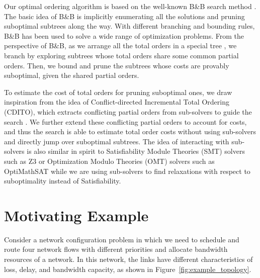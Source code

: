 \documentclass[letterpaper]{article} %
\theoremstyle{definition}
\begin{document}
Our optimal ordering algorithm is based on the well-known B\&B search method \cite{lawler1966branch}. The basic idea of B\&B is implicitly enumerating all the solutions and pruning suboptimal subtrees along the way. With different branching and bounding rules, B\&B has been used to solve a wide range of optimization problems. From the perspective of B\&B, as we arrange all the total orders in a special tree \cite{ono2005constant}, we branch by exploring subtrees whose total orders share some common partial orders. Then, we bound and prune the subtrees whose costs are provably suboptimal, given the shared partial orders. 

To estimate the cost of total orders for pruning suboptimal ones, we draw inspiration from the idea of Conflict-directed Incremental Total Ordering (CDITO), which extracts conflicting partial orders from sub-solvers to guide the search \cite{chen2019efficiently}. We further extend these conflicting partial orders to account for costs, and thus the search is able to estimate total order costs without using sub-solvers and directly jump over suboptimal subtrees. The idea of interacting with sub-solvers is also similar in spirit to Satisfiability Module Theories (SMT) solvers such as Z3 \cite{de2008z3} or Optimization Modulo Theories (OMT) solvers such as OptiMathSAT \cite{sebastiani2020optimathsat} while we are using sub-solvers to find relaxations with respect to suboptimality instead of Satisfiability.


\section{Motivating Example}\label{section:example}
Consider a network configuration problem in which we need to schedule and route four network flows with different priorities and allocate bandwidth resources of a network. In this network, the links have different characteristics of loss, delay, and bandwidth capacity, as shown in Figure~\ref{fig:example_topology}.
\end{document}
